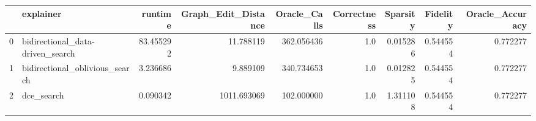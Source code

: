 \begin{tabular}{llrrrrrrr}
\toprule
{} &                         explainer &    runtime &  Graph\_Edit\_Distance &  Oracle\_Calls &  Correctness &  Sparsity &  Fidelity &  Oracle\_Accuracy \\
\midrule
0 &  bidirectional\_data-driven\_search &  83.455292 &            11.788119 &    362.056436 &          1.0 &  0.015286 &  0.544554 &         0.772277 \\
1 &    bidirectional\_oblivious\_search &   3.236686 &             9.889109 &    340.734653 &          1.0 &  0.012825 &  0.544554 &         0.772277 \\
2 &                        dce\_search &   0.090342 &          1011.693069 &    102.000000 &          1.0 &  1.311108 &  0.544554 &         0.772277 \\
\bottomrule
\end{tabular}
